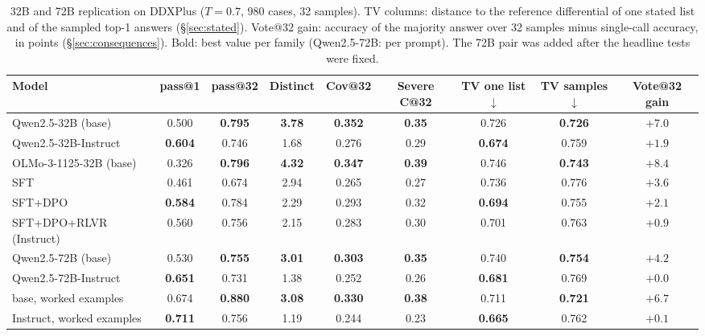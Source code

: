 \documentclass[wcp]{jmlr}
\begin{document}
\begin{table}[t]
\centering\small
\setlength{\tabcolsep}{3.5pt}
\begin{adjustbox}{max width=\linewidth}
\begin{tabular}{lcccccccc}
\toprule
Model & pass@1 & pass@32 & Distinct & Cov@32 & Severe C@32 & TV one list$\downarrow$ & TV samples$\downarrow$ & Vote@32 gain \\
\midrule
Qwen2.5-32B (base) & 0.500 & \textbf{0.795} & \textbf{3.78} & \textbf{0.352} & \textbf{0.35} & 0.726 & \textbf{0.726} & $+7.0$ \\
Qwen2.5-32B-Instruct & \textbf{0.604} & 0.746 & 1.68 & 0.276 & 0.29 & \textbf{0.674} & 0.759 & $+1.9$ \\
\midrule
OLMo-3-1125-32B (base) & 0.326 & \textbf{0.796} & \textbf{4.32} & \textbf{0.347} & \textbf{0.39} & 0.746 & \textbf{0.743} & $+8.4$ \\
\quad SFT & 0.461 & 0.674 & 2.94 & 0.265 & 0.27 & 0.736 & 0.776 & $+3.6$ \\
\quad SFT+DPO & \textbf{0.584} & 0.784 & 2.29 & 0.293 & 0.32 & \textbf{0.694} & 0.755 & $+2.1$ \\
\quad SFT+DPO+RLVR (Instruct) & 0.560 & 0.756 & 2.15 & 0.283 & 0.30 & 0.701 & 0.763 & $+0.9$ \\
\midrule
Qwen2.5-72B (base) & 0.530 & \textbf{0.755} & \textbf{3.01} & \textbf{0.303} & \textbf{0.35} & 0.740 & \textbf{0.754} & $+4.2$ \\
Qwen2.5-72B-Instruct & \textbf{0.651} & 0.731 & 1.38 & 0.252 & 0.26 & \textbf{0.681} & 0.769 & $+0.0$ \\
\quad base, worked examples & 0.674 & \textbf{0.880} & \textbf{3.08} & \textbf{0.330} & \textbf{0.38} & 0.711 & \textbf{0.721} & $+6.7$ \\
\quad Instruct, worked examples & \textbf{0.711} & 0.756 & 1.19 & 0.244 & 0.23 & \textbf{0.665} & 0.762 & $+0.1$ \\
\bottomrule
\end{tabular}
\end{adjustbox}
\caption{32B and 72B replication on DDXPlus ($T{=}0.7$, 980 cases, 32 samples). TV columns: distance to the reference differential of one stated list and of the sampled top-1 answers (\S\ref{sec:stated}). Vote@32 gain: accuracy of the majority answer over 32 samples minus single-call accuracy, in points (\S\ref{sec:consequences}). Bold: best value per family (Qwen2.5-72B: per prompt). The 72B pair was added after the headline tests were fixed.}
\label{tab:big32}
\end{table}
\end{document}
